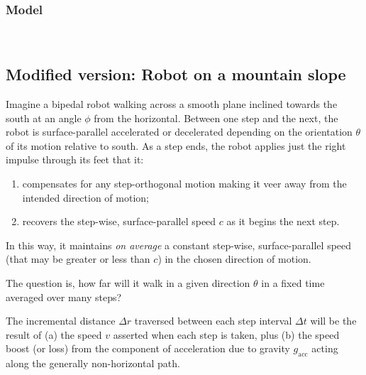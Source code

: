 \documentclass[11pt]{article}
\providecommand{\tightlist}{%
      \setlength{\itemsep}{0pt}\setlength{\parskip}{0pt}}
\begin{document}
    \hypertarget{model}{%
\subsubsection*{Model}\label{model}}

 
            
    
    \begin{center}
    \end{center}
    { \hspace*{\fill} \\}
    

    \hypertarget{modified-version-robot-on-a-mountain-slope}{%
\subsection*{Modified version: Robot on a mountain
slope}\label{modified-version-robot-on-a-mountain-slope}}

    Imagine a bipedal robot walking across a smooth plane inclined towards
the south at an angle \(\phi\) from the horizontal. Between one step and
the next, the robot is surface-parallel accelerated or decelerated
depending on the orientation \(\theta\) of its motion relative to south.
As a step ends, the robot applies just the right impulse through its
feet that it:

\begin{enumerate}
\def\labelenumi{\arabic{enumi}.}
\tightlist
\item
  compensates for any step-orthogonal motion making it veer away from
  the intended direction of motion;
\item
  recovers the step-wise, surface-parallel speed \(c\) as it begins the
  next step.
\end{enumerate}

In this way, it maintains \emph{on average} a constant step-wise,
surface-parallel speed (that may be greater or less than \(c\)) in the
chosen direction of motion.

The question is, how far will it walk in a given direction \(\theta\) in
a fixed time averaged over many steps?

The incremental distance \(\Delta{r}\) traversed between each step
interval \(\Delta{t}\) will be the result of (a) the speed \(v\)
asserted when each step is taken, plus (b) the speed boost (or loss)
from the component of acceleration due to gravity \(g_{\mathrm{acc}}\)
acting along the generally non-horizontal path.
\end{document}
